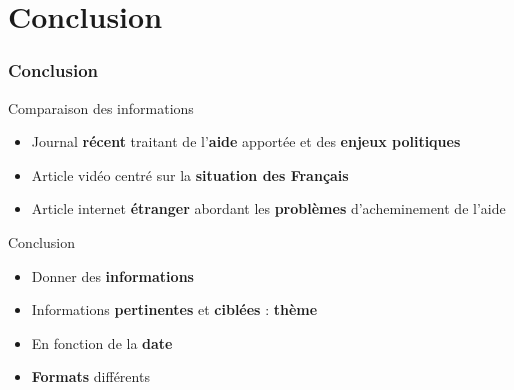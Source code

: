 \section{Conclusion}
\begin{frame}
\frametitle{Conclusion}
  \begin{block}{Comparaison des informations}
    \begin{itemize}
      \item{Journal \textbf{récent} traitant de l'\textbf{aide} apportée et des \textbf{enjeux politiques}}
      \item{Article vidéo centré sur la \textbf{situation des Français}}
      \item{Article internet \textbf{étranger} abordant les \textbf{problèmes} d'acheminement de l'aide}
    \end{itemize} 
  \end{block} \pause
  
  \begin{block}{Conclusion}
    \begin{itemize}
      \item{Donner des \textbf{informations}}
      \item{Informations \textbf{pertinentes} et \textbf{ciblées} : \textbf{thème}}
      \item{En fonction de la \textbf{date}}
      \item{\textbf{Formats} différents}
    \end{itemize}
  \end{block}
\end{frame}
